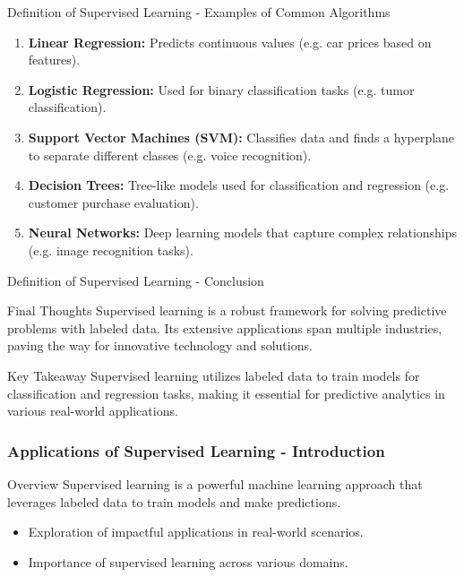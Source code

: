 \documentclass[aspectratio=169]{beamer}
\begin{document}
\begin{frame}[fragile]{Definition of Supervised Learning - Examples of Common Algorithms}
    \begin{enumerate}
        \item \textbf{Linear Regression:} Predicts continuous values (e.g. car prices based on features).
        \item \textbf{Logistic Regression:} Used for binary classification tasks (e.g. tumor classification).
        \item \textbf{Support Vector Machines (SVM):} Classifies data and finds a hyperplane to separate different classes (e.g. voice recognition).
        \item \textbf{Decision Trees:} Tree-like models used for classification and regression (e.g. customer purchase evaluation).
        \item \textbf{Neural Networks:} Deep learning models that capture complex relationships (e.g. image recognition tasks).
    \end{enumerate}
\end{frame}

\begin{frame}[fragile]{Definition of Supervised Learning - Conclusion}
    \begin{block}{Final Thoughts}
        Supervised learning is a robust framework for solving predictive problems with labeled data. Its extensive applications span multiple industries, paving the way for innovative technology and solutions.
    \end{block}
    
    \begin{block}{Key Takeaway}
        Supervised learning utilizes labeled data to train models for classification and regression tasks, making it essential for predictive analytics in various real-world applications.
    \end{block}
\end{frame}

\begin{frame}[fragile]
  \frametitle{Applications of Supervised Learning - Introduction}
  \begin{block}{Overview}
    Supervised learning is a powerful machine learning approach that leverages labeled data to train models and make predictions. 
  \end{block}
  \begin{itemize}
    \item Exploration of impactful applications in real-world scenarios.
    \item Importance of supervised learning across various domains.
  \end{itemize}
\end{frame}
\end{document}
